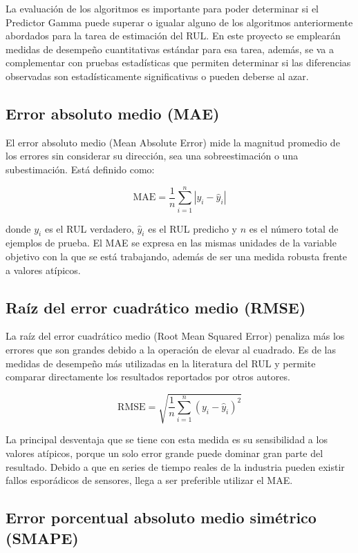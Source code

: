La evaluación de los algoritmos es importante para poder determinar si el Predictor Gamma puede superar o igualar alguno de los algoritmos anteriormente abordados para la tarea de estimación del RUL. En este proyecto se emplearán medidas de desempeño cuantitativas estándar para esa tarea, además, se va a complementar con pruebas estadísticas que permiten determinar si las diferencias observadas son estadísticamente significativas o pueden deberse al azar.

\subsection{Error absoluto medio (MAE)}

El error absoluto medio (Mean Absolute Error) mide la magnitud promedio de los errores sin considerar su dirección, sea una sobreestimación o una subestimación. Está definido como:

\[
    \mathrm{MAE} = \frac{1}{n} \sum_{i=1}^{n} \left| y_i - \hat{y}_i \right|
\]

donde $y_i$ es el RUL verdadero, $\hat{y}_i$ es el RUL predicho y $n$ es el número total de ejemplos de prueba. El MAE se expresa en las mismas unidades de la variable objetivo con la que se está trabajando, además de ser una medida robusta frente a valores atípicos.\\[.15cm]

\subsection{Raíz del error cuadrático medio (RMSE)}

La raíz del error cuadrático medio (Root Mean Squared Error) penaliza más los errores que son grandes debido a la operación de elevar al cuadrado. Es de las medidas de desempeño más utilizadas en la literatura del RUL y permite comparar directamente los resultados reportados por otros autores.

\[
\mathrm{RMSE} = \sqrt{\frac{1}{n} \sum_{i=1}^{n} (y_i - \hat{y}_i)^2}
\]

La principal desventaja que se tiene con esta medida es su sensibilidad a los valores atípicos, porque un solo error grande puede dominar gran parte del resultado. Debido a que en series de tiempo reales de la industria pueden existir fallos esporádicos de sensores, llega a ser preferible utilizar el MAE.\\[.15cm]

\subsection{Error porcentual absoluto medio simétrico (SMAPE)}

